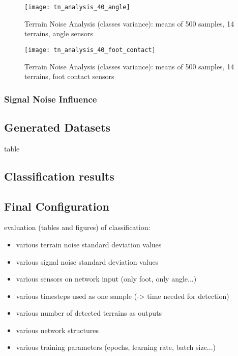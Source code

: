 \begin{figure}[H]
  \centering
  \texttt{[image: tn\_analysis\_40\_angle]}
  \caption{Terrain Noise Analysis (classes variance): means of 500 samples, 14 terrains, angle sensors}
  \label{fig:tn_analysis_angle}
\end{figure}

\begin{figure}[H]
  \centering
  \texttt{[image: tn\_analysis\_40\_foot\_contact]}
  \caption{Terrain Noise Analysis (classes variance): means of 500 samples, 14 terrains, foot contact sensors}
  \label{fig:tn_analysis_foot_contact}
\end{figure}

\subsubsection*{Signal Noise Influence} \label{sssec:signal_noise_influence}


\subsection{Generated Datasets} \label{ssec:generated_datasets}

table

\subsection{Classification results} \label{ssec:classification_results}

\subsection{Final Configuration} \label{ssec:final_configuration}


evaluation (tables and figures) of classification:
\begin{itemize}
\item various terrain noise standard deviation values
\item various signal noise standard deviation values
\item various sensors on network input (only foot, only angle...)
\item various timesteps used as one sample (-> time needed for detection)
\item various number of detected terrains as outputs
\item various network structures
\item various training parameters (epochs, learning rate, batch size...)
\end{itemize}


